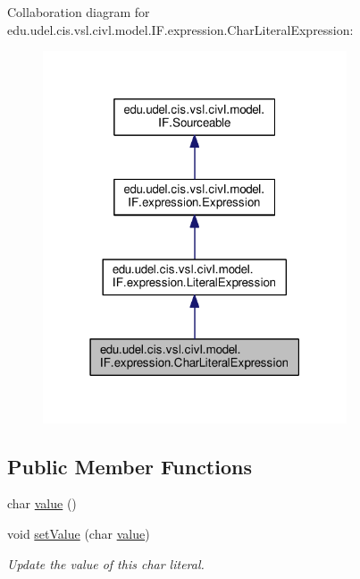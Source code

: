 Collaboration diagram for edu.\+udel.\+cis.\+vsl.\+civl.\+model.\+I\+F.\+expression.\+Char\+Literal\+Expression\+:
\nopagebreak
\begin{figure}[H]
\begin{center}
\leavevmode
\includegraphics[width=255pt]{interfaceedu_1_1udel_1_1cis_1_1vsl_1_1civl_1_1model_1_1IF_1_1expression_1_1CharLiteralExpression__coll__graph}
\end{center}
\end{figure}
\subsection*{Public Member Functions}
\begin{DoxyCompactItemize}
\item 
char \hyperlink{interfaceedu_1_1udel_1_1cis_1_1vsl_1_1civl_1_1model_1_1IF_1_1expression_1_1CharLiteralExpression_a200ee58cca3d6149daf3d1c76b203778}{value} ()
\item 
void \hyperlink{interfaceedu_1_1udel_1_1cis_1_1vsl_1_1civl_1_1model_1_1IF_1_1expression_1_1CharLiteralExpression_ae1a09565238895730263457dc728aaf5}{set\+Value} (char \hyperlink{interfaceedu_1_1udel_1_1cis_1_1vsl_1_1civl_1_1model_1_1IF_1_1expression_1_1CharLiteralExpression_a200ee58cca3d6149daf3d1c76b203778}{value})
\begin{DoxyCompactList}\small\item\em Update the value of this char literal. \end{DoxyCompactList}\end{DoxyCompactItemize}


